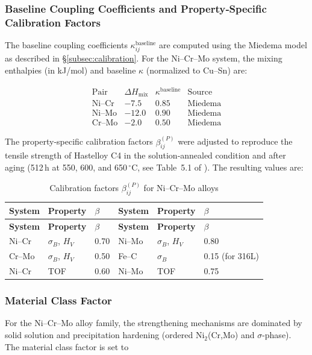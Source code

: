\documentclass[12pt,a4paper]{article}
\begin{document}
	\subsubsection{Baseline Coupling Coefficients and Property‑Specific Calibration Factors}
	The baseline coupling coefficients \(\kappa_{ij}^{\text{baseline}}\) are computed using the Miedema model as described in \S\ref{subsec:calibration}. For the Ni–Cr–Mo system, the mixing enthalpies (in kJ/mol) and baseline \(\kappa\) (normalized to Cu–Sn) are:
	
	\[
	\begin{array}{lccc}
		\text{Pair} & \Delta H_{\text{mix}} & \kappa^{\text{baseline}} & \text{Source} \\
		\hline
		\text{Ni–Cr} & -7.5 & 0.85 & \text{Miedema} \\
		\text{Ni–Mo} & -12.0 & 0.90 & \text{Miedema} \\
		\text{Cr–Mo} & -2.0 & 0.50 & \text{Miedema}
	\end{array}
	\]
	
	The property‑specific calibration factors \(\beta_{ij}^{(P)}\) were adjusted to reproduce the tensile strength of Hastelloy C4 in the solution‑annealed condition and after aging (512\,h at 550, 600, and 650\,\(^{\circ}\)C, see Table~5.1 of \cite{dis2025}). The resulting values are:
	
	\begin{longtable}{p{1.5cm} p{1.5cm} p{1.5cm} p{1.5cm} p{1.5cm} p{1.5cm}}
		\caption{Calibration factors \(\beta_{ij}^{(P)}\) for Ni–Cr–Mo alloys}\label{tab:nicrmo_beta}\\
		\toprule
		\textbf{System} & \textbf{Property} & \(\beta\) & \textbf{System} & \textbf{Property} & \(\beta\) \\
		\midrule
		\endfirsthead
		\toprule
		\textbf{System} & \textbf{Property} & \(\beta\) & \textbf{System} & \textbf{Property} & \(\beta\) \\
		\midrule
		\endhead
		Ni–Cr   & \(\sigma_B\), \(H_V\) & 0.70 & Ni–Mo   & \(\sigma_B\), \(H_V\) & 0.80 \\
		Cr–Mo   & \(\sigma_B\), \(H_V\) & 0.50 & Fe–C    & \(\sigma_B\)        & 0.15 (for 316L) \\
		Ni–Cr   & TOF              & 0.60 & Ni–Mo   & TOF              & 0.75 \\
		\bottomrule
	\end{longtable}
	
	\subsubsection{Material Class Factor}
	For the Ni–Cr–Mo alloy family, the strengthening mechanisms are dominated by solid solution and precipitation hardening (ordered Ni\(_2\)(Cr,Mo) and \(\sigma\)-phase). The material class factor is set to
	
\end{document}
